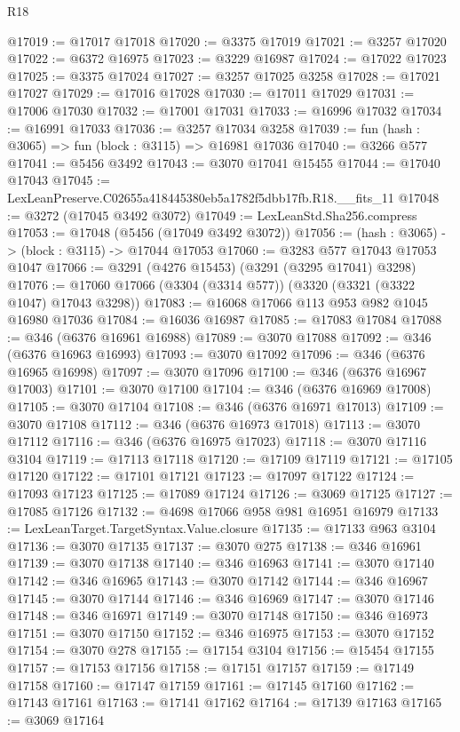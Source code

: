 \begin{lexlean}{R18}
\begin{coremodule}
@17019 := @17017 @17018
@17020 := @3375 @17019
@17021 := @3257 @17020
@17022 := @6372 @16975
@17023 := @3229 @16987
@17024 := @17022 @17023
@17025 := @3375 @17024
@17027 := @3257 @17025 @3258
@17028 := @17021 @17027
@17029 := @17016 @17028
@17030 := @17011 @17029
@17031 := @17006 @17030
@17032 := @17001 @17031
@17033 := @16996 @17032
@17034 := @16991 @17033
@17036 := @3257 @17034 @3258
@17039 := fun (hash : @3065) => fun (block : @3115) => @16981 @17036
@17040 := @3266 @577
@17041 := @5456 @3492
@17043 := @3070 @17041 @15455
@17044 := @17040 @17043
@17045 := LexLeanPreserve.C02655a418445380eb5a1782f5dbb17fb.R18.__fits_11
@17048 := @3272 (@17045 @3492 @3072)
@17049 := LexLeanStd.Sha256.compress
@17053 := @17048 (@5456 (@17049 @3492 @3072))
@17056 := (hash : @3065) -> (block : @3115) -> @17044 @17053
@17060 := @3283 @577 @17043 @17053 @1047
@17066 := @3291 (@4276 @15453) (@3291 (@3295 @17041) @3298)
@17076 := @17060 @17066 (@3304 (@3314 @577)) (@3320 (@3321 (@3322 @1047) @17043 @3298))
@17083 := @16068 @17066 @113 @953 @982 @1045 @16980 @17036
@17084 := @16036 @16987
@17085 := @17083 @17084
@17088 := @346 (@6376 @16961 @16988)
@17089 := @3070 @17088
@17092 := @346 (@6376 @16963 @16993)
@17093 := @3070 @17092
@17096 := @346 (@6376 @16965 @16998)
@17097 := @3070 @17096
@17100 := @346 (@6376 @16967 @17003)
@17101 := @3070 @17100
@17104 := @346 (@6376 @16969 @17008)
@17105 := @3070 @17104
@17108 := @346 (@6376 @16971 @17013)
@17109 := @3070 @17108
@17112 := @346 (@6376 @16973 @17018)
@17113 := @3070 @17112
@17116 := @346 (@6376 @16975 @17023)
@17118 := @3070 @17116 @3104
@17119 := @17113 @17118
@17120 := @17109 @17119
@17121 := @17105 @17120
@17122 := @17101 @17121
@17123 := @17097 @17122
@17124 := @17093 @17123
@17125 := @17089 @17124
@17126 := @3069 @17125
@17127 := @17085 @17126
@17132 := @4698 @17066 @958 @981 @16951 @16979
@17133 := LexLeanTarget.TargetSyntax.Value.closure
@17135 := @17133 @963 @3104
@17136 := @3070 @17135
@17137 := @3070 @275
@17138 := @346 @16961
@17139 := @3070 @17138
@17140 := @346 @16963
@17141 := @3070 @17140
@17142 := @346 @16965
@17143 := @3070 @17142
@17144 := @346 @16967
@17145 := @3070 @17144
@17146 := @346 @16969
@17147 := @3070 @17146
@17148 := @346 @16971
@17149 := @3070 @17148
@17150 := @346 @16973
@17151 := @3070 @17150
@17152 := @346 @16975
@17153 := @3070 @17152
@17154 := @3070 @278
@17155 := @17154 @3104
@17156 := @15454 @17155
@17157 := @17153 @17156
@17158 := @17151 @17157
@17159 := @17149 @17158
@17160 := @17147 @17159
@17161 := @17145 @17160
@17162 := @17143 @17161
@17163 := @17141 @17162
@17164 := @17139 @17163
@17165 := @3069 @17164

\end{coremodule}
\end{lexlean}
